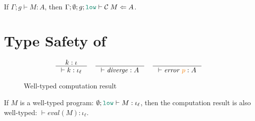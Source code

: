 \begin{theorem}
  \label{thm:compile-pres}
  If $\Gamma ; g \vdash M : A$, then $\Gamma ; \emptyset ; g ; \low \vdash \compile{M} \Leftarrow A$.
\end{theorem}

\section{Type Safety of \Surface}
\label{sec:surface-type-safety}

\begin{figure}[tbp]
  \raggedright
  \begin{gather*}
    \inference{k : \iota}{\vdash k : \iota_{\ell}}
    \quad
    \inference{}{\vdash \mathit{diverge} : A}
    \quad
    \inference{}{\vdash \mathit{error}\;\bl{p} : A}
  \end{gather*}
  \caption{Well-typed computation result}
  \label{fig:wt-result}
\end{figure}

\begin{theorem}
  \label{thm:type-safety}
  If $M$ is a well-typed \Surface program: $\emptyset;\low \vdash M : \iota_{\ell}$,
  then the computation result is also well-typed: $\vdash \mathit{eval}(M) : \iota_{\ell}$.
\end{theorem}
